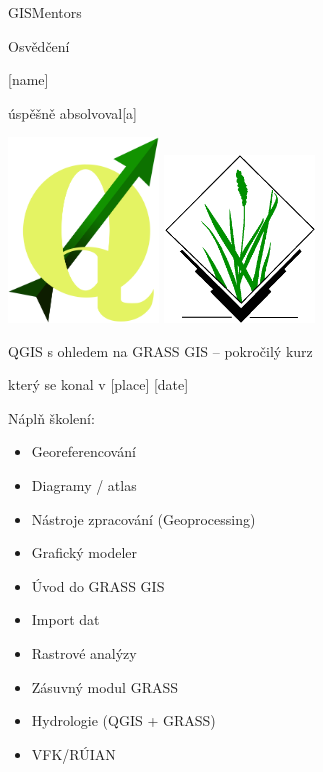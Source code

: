 \documentclass[12pt, a4paper]{letter}
\begin{document}
\pagestyle{empty}
\begin{center}

{\Large GISMentors}

{\Huge Osvědčení}

{\Large [name]}

úspěšně absolvoval[a]

\includegraphics[width=0.30\textwidth]{../images/qgislogo_vector.eps}
\includegraphics[width=0.30\textwidth]{../images/grasslogo_vector.eps}

{\Large QGIS s ohledem na GRASS GIS -- pokročilý kurz}

který se konal v [place] [date]
\end{center}

Náplň školení:

\begin{multicols}{2}
\begin{itemize}
        \item Georeferencování
        \item Diagramy / atlas
        \item Nástroje zpracování (Geoprocessing)
        \item Grafický modeler
\end{itemize}
\columnbreak
\begin{itemize}
        \item Úvod do GRASS GIS
        \item Import dat
        \item Rastrové analýzy
        \item Zásuvný modul GRASS
        \item Hydrologie (QGIS + GRASS)
        \item VFK/RÚIAN
\end{itemize}
\end{multicols}
\end{document}

